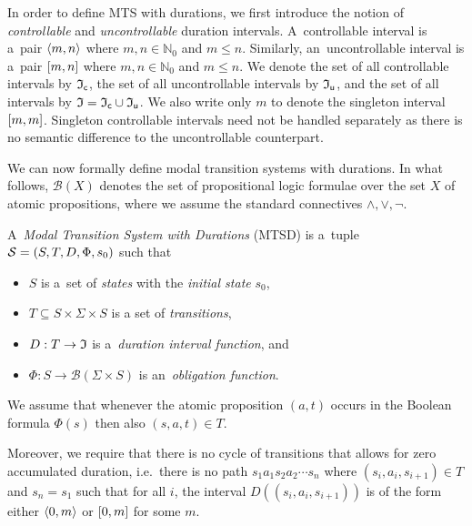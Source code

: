 

In order to define MTS with durations, we first introduce the notion of
\emph{controllable} and \emph{uncontrollable} duration intervals.
A~controllable interval is a~pair $\langle m,n\rangle$ where $m,n \in \mathbb N_0$
and $m \le n$. Similarly, an~uncontrollable interval is a~pair $[m,n]$
where $m,n \in \mathbb N_0$ and $m \le n$.
We denote the set of all controllable intervals by $\mathfrak I_\mathsf c$, the set of all
uncontrollable intervals by $\mathfrak I_\mathsf u$, and the set of all intervals by 
$\mathfrak I = \mathfrak I_\mathsf c \cup \mathfrak I_\mathsf u$.
We also write only $m$ to denote the singleton interval $[m,m]$. 
Singleton controllable intervals need not be handled separately as there is no semantic difference to the uncontrollable counterpart.


We can now formally define modal transition systems with durations. 
In what follows, $\mathcal B(X)$ denotes the set of propositional logic 
formulae over the set $X$ of atomic propositions, where we assume the standard connectives $\wedge,\vee,\neg$.

\begin{definition}[MTSD] 
A~\emph{Modal Transition System with Durations} \allowbreak (MTSD) is a~tuple
$\mathcal S = (S,T,D,\Phi,s_0)$ such that
\begin{itemize}
 	\item $S$ is a~set of \emph{states} with the
\emph{initial state} $s_0$,
 	\item $T \subseteq S \times \Sigma \times S$ is a set of
\emph{transitions},
 	\item $D : T \to \mathfrak I$ is a~\emph{duration interval
function}, and
 	\item $\Phi : S \to \mathcal B(\Sigma\times S)$ is
an~\emph{obligation function}.
 \end{itemize}     
 We assume that whenever the atomic proposition
$(a,t)$ occurs in the \allowbreak Boolean formula $\Phi(s)$ then also $(s,a,t) \in T$. 

Moreover, we require that there is no cycle of transitions that allows 
for zero accumulated duration, i.e.~there is no path
$s_1a_1s_2a_2\cdots s_n$ where \linebreak $(s_i,a_i,s_{i+1}) \in T$ and $s_n=s_1$
such that for all $i$, the interval $D((s_i,a_i,s_{i+1}))$ 
is of the form either $\langle0,m\rangle$ or $[0,m]$ for some $m$.
\end{definition}

